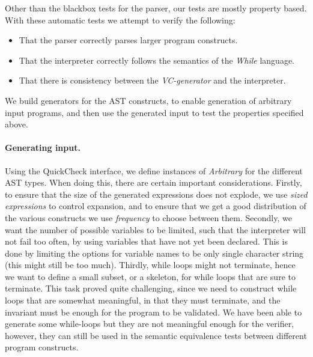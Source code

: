 Other than the blackbox tests for the parser, our tests are mostly property based.
With these automatic tests we attempt to verify the following:
\begin{itemize}
	\item That the parser correctly parses larger program constructs.
	\item That the interpreter correctly follows the semantics of the \textit{While} language.
	\item That there is consistency between the \textit{VC-generator} and the interpreter.
\end{itemize}
We build generators for the AST constructs, to enable generation of arbitrary input programs, and then use the generated input to test the properties specified above.

\paragraph{Generating input.}
Using the QuickCheck interface, we define instances of \textit{Arbitrary} for the different AST types.
When doing this, there are certain important considerations.
Firstly, to ensure that the size of the generated expressions does not explode, we use \textit{sized expressions} to control expansion, and to ensure that we get a good distribution of the various constructs we use \textit{frequency} to choose between them.
Secondly, we want the number of possible variables to be limited, such that the interpreter will not fail too often, by using variables that have not yet been declared.
This is done by limiting the options for variable names to be only single character string (this might still be too much).
Thirdly, while loops might not terminate, hence we want to define a small subset, or a skeleton, for while loops that are sure to terminate. 
This task proved quite challenging, since we need to construct while loops that are somewhat meaningful, in that they must terminate, and the invariant must be enough for the program to be validated. We have been able to generate some while-loops but they are not meaningful enough for the verifier, however, they can still be used in the semantic equivalence tests between different program constructs.

